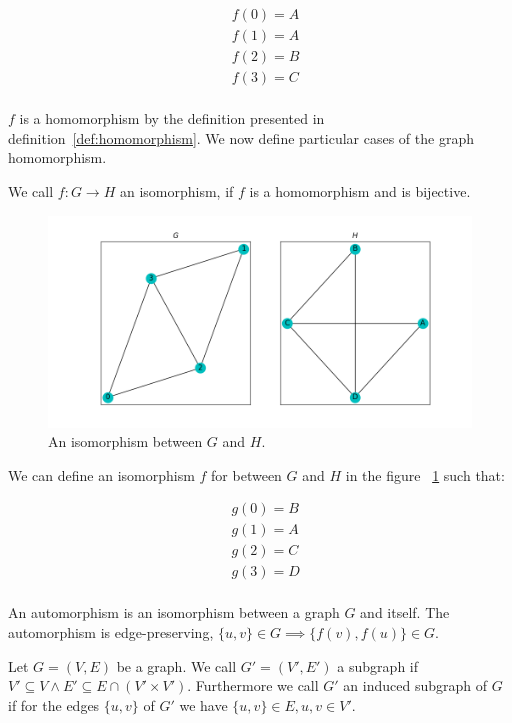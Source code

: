 \begin{align*}
    &f(0) = A\\
    &f(1) = A\\
    &f(2) = B\\
    &f(3) = C\\ 
\end{align*}

\noindent $f$ is a homomorphism by the definition presented in definition~\ref{def:homomorphism}. 
We now define particular cases of the graph homomorphism.

\begin{dfn}
    We call $f: G \rightarrow H$ an isomorphism,
 if $f$ is a homomorphism and is bijective.
\end{dfn}

\begin{figure}[h!]
    \includegraphics[width=12cm]{Images/graph_isomoprhism.png}
    \centering
    \caption{An isomorphism between $G$ and $H$.}
    \label{fig:isomorphism}
\end{figure}

\noindent We can define an isomorphism $f$ for between $G$ and $H$ in the figure ~\ref{fig:isomorphism} such that:

\begin{align*}
    &g(0) = B\\
    &g(1) = A\\
    &g(2) = C\\
    &g(3) = D\\ 
\end{align*}

\begin{dfn}
    An automorphism is an isomorphism between a graph $G$ and itself. The automorphism 
    is edge-preserving, $\{u,v\} \in G \implies \{f(v),f(u)\} \in G$.
\end{dfn}

\begin{dfn}
    Let $G=(V,E)$ be a graph. We call $G'=(V',E')$ a subgraph if
     $V' \subseteq V \land E' \subseteq E \cap (V' \times V')$. Furthermore we call $G'$
     an induced subgraph of $G$ if for the edges $\{u,v\}$ of $G'$ we have $\{u,v\} \in E, u,v \in V'$.
\end{dfn}

